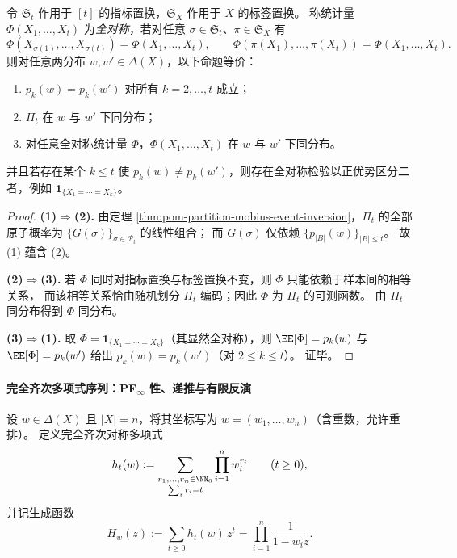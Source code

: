 \begin{theorem}\label{thm:pom-finite-sample-indistinguishability-power-sums}
令 \(\mathfrak{S}_t\) 作用于 \([t]\) 的指标置换，\(\mathfrak{S}_X\) 作用于 \(X\) 的标签置换。
称统计量 \(\Phi(X_1,\dots,X_t)\) 为\emph{全对称}，若对任意 \(\sigma\in\mathfrak{S}_t\)、\(\pi\in\mathfrak{S}_X\) 有
\[
\Phi(X_{\sigma(1)},\dots,X_{\sigma(t)})=\Phi(X_1,\dots,X_t),
\qquad
\Phi(\pi(X_1),\dots,\pi(X_t))=\Phi(X_1,\dots,X_t).
\]
则对任意两分布 \(w,w'\in\Delta(X)\)，以下命题等价：
\begin{enumerate}
  \item \(p_k(w)=p_k(w')\) 对所有 \(k=2,\dots,t\) 成立；
  \item \(\Pi_t\) 在 \(w\) 与 \(w'\) 下同分布；
  \item 对任意全对称统计量 \(\Phi\)，\(\Phi(X_1,\dots,X_t)\) 在 \(w\) 与 \(w'\) 下同分布。
\end{enumerate}
并且若存在某个 \(k\le t\) 使 \(p_k(w)\neq p_k(w')\)，则存在全对称检验以正优势区分二者，例如 \(\mathbf{1}_{\{X_1=\cdots=X_k\}}\)。
\end{theorem}
\begin{proof}
\textbf{(1)\(\Rightarrow\)(2).}
由定理 \ref{thm:pom-partition-mobius-event-inversion}，\(\Pi_t\) 的全部原子概率为 \(\{G(\sigma)\}_{\sigma\in\mathcal{P}_t}\) 的线性组合；
而 \(G(\sigma)\) 仅依赖 \(\{p_{|B|}(w)\}_{|B|\le t}\)。
故 (1) 蕴含 (2)。
\par
\textbf{(2)\(\Rightarrow\)(3).}
若 \(\Phi\) 同时对指标置换与标签置换不变，则 \(\Phi\) 只能依赖于样本间的相等关系，
而该相等关系恰由随机划分 \(\Pi_t\) 编码；因此 \(\Phi\) 为 \(\Pi_t\) 的可测函数。
由 \(\Pi_t\) 同分布得到 \(\Phi\) 同分布。
\par
\textbf{(3)\(\Rightarrow\)(1).}
取 \(\Phi=\mathbf 1_{\{X_1=\cdots=X_k\}}\)（其显然全对称），则
\(
\EE[\Phi]=p_k(w)
\)
与
\(
\EE[\Phi]=p_k(w')
\)
给出 \(p_k(w)=p_k(w')\)（对 \(2\le k\le t\)）。
证毕。
\end{proof}

\paragraph{完全齐次多项式序列：PF\texorpdfstring{$_\infty$}{∞} 性、递推与有限反演}
设 \(w\in\Delta(X)\) 且 \(|X|=n\)，将其坐标写为 \(w=(w_1,\dots,w_n)\)（含重数，允许重排）。
定义完全齐次对称多项式
\[
h_t(w):=\sum_{\substack{r_1,\dots,r_n\in\NN_0\\ \sum_i r_i=t}}\prod_{i=1}^n w_i^{r_i}\qquad(t\ge0),
\]
并记生成函数
\[
H_w(z):=\sum_{t\ge0}h_t(w)\,z^t=\prod_{i=1}^n\frac{1}{1-w_i z}.
\]

